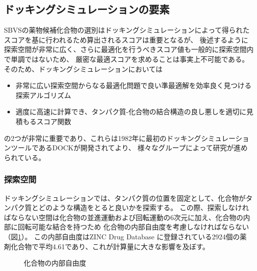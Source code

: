 \subsection{ドッキングシミュレーションの要素}\label{subsec:docking_elements}
SBVSの薬物候補化合物の選別はドッキングシミュレーションによって得られたスコアを基に行われるため算出されるスコアは重要となるが、
後述するように探索空間が非常に広く、さらに最適化を行うべきスコア値も一般的に探索空間内で単調ではないため、
厳密な最適スコアを求めることは事実上不可能である。そのため、ドッキングシミュレーションにおいては
\begin{itemize}
\item 非常に広い探索空間からなる最適化問題で良い準最適解を効率良く見つける探索アルゴリズム
\item 適度に高速に計算でき、タンパク質-化合物の結合構造の良し悪しを適切に見積もるスコア関数
\end{itemize}
の2つが非常に重要であり、これらは1982年に最初のドッキングシミュレーションツールであるDOCK\cite{Kuntz1982}が開発されてより、
様々なグループによって研究が進められている。

\subsubsection{探索空間}
ドッキングシミュレーションでは、タンパク質の位置を固定として、化合物がタンパク質とどのような構造をとると良いかを探索する。
この際、探索しなければならない空間は化合物の並進運動および回転運動の6次元に加え、化合物の内部に回転可能な結合を持つため
化合物の内部自由度を考慮しなければならない（図\ref{fig:docking_freedom}）。
この内部自由度はZINC Drug Database に登録されている2924個の薬剤化合物で平均4.61であり、これが計算量に大きな影響を及ぼす。

\begin{figure}[tb]
 \begin{center}
  \caption{化合物の内部自由度}
  \label{fig:docking_freedom}
 \end{center}
\end{figure}


